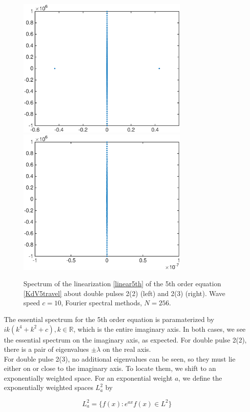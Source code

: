\documentclass[12pt]{article}
\def\R{{\mathbb R}}
\begin{document}
\begin{figure}[H]
	\includegraphics[width=8.5cm]{four10ud2_2}
	\includegraphics[width=8.5cm]{four10ud2_3}
	\caption{Spectrum of the linearization \eqref{linear5th} of the 5th order equation \eqref{KdV5travel} about double pulses 2(2) (left) and 2(3) (right). Wave speed $c = 10$, Fourier spectral methods, $N = 256$.}
\end{figure}

The essential spectrum for the 5th order equation is paramaterized by $ik(k^4 + k^2 + c), k \in \R$, which is the entire imaginary axis. In both cases, we see the essential spectrum on the imaginary axis, as expected. For double pulse 2(2), there is a pair of eigenvalues $\pm \lambda$ on the real axis.\\

For double pulse 2(3), no additional eigenvalues can be seen, so they must lie either on or close to the imaginary axis. To locate them, we shift to an exponentially weighted space. For an exponential weight $a$, we define the exponentially weighted spaces $L^2_a$ by

\begin{equation}\label{expweightedspace}
L^2_a = \{ f(x) : e^{ax} f(x) \in L^2\}
\end{equation}
\end{document}
